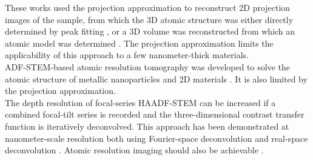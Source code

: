 \documentclass[12pt]{iopart}
\begin{document}
These works used the projection approximation to reconstruct 2D projection images of the sample, from which the 3D atomic structure was either directly determined by peak fitting \cite{Hofer_Mustonen_Skakalova_Pennycook_2023}, or a 3D volume was reconstructed from which an atomic model was determined \cite{Pelz_2023}. The projection approximation limits the applicability of this approach to a few nanometer-thick materials.\\
ADF-STEM-based atomic resolution tomography \cite{Scott_2012} was developed to solve the atomic structure of metallic nanoparticles and 2D materials \cite{Miao_Ercius_Billinge_2016}. It is also limited by the projection approximation.\\
The depth resolution of focal-series HAADF-STEM can be increased if a combined focal-tilt series is recorded and the three-dimensional contrast transfer function is iteratively deconvolved. This approach has been demonstrated at nanometer-scale resolution both using Fourier-space deconvolution \cite{Hovden_2014,Hovden_2014b} and real-space deconvolution \cite{Dahmen_2015, Dahmen_Jonge_2014,Dahmen_2015b}. Atomic resolution imaging should also be achievable \cite{Yalisove_Sung_Ercius_Hovden_2021}.\\
\end{document}
